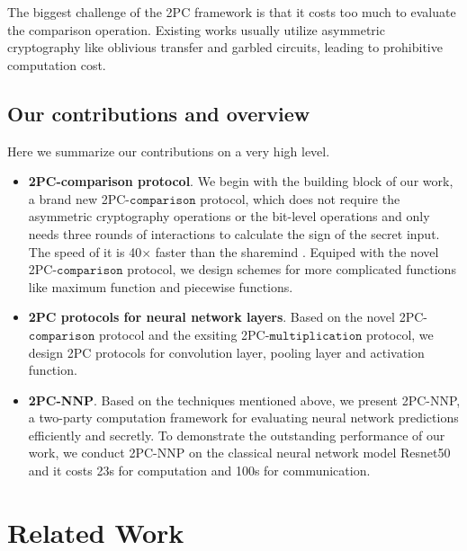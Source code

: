 \documentclass[letterpaper]{article} %
\begin{document}
    The biggest challenge of the 2PC framework is that it costs too much to
    evaluate the comparison operation.
    Existing works usually utilize asymmetric cryptography like oblivious transfer and garbled circuits,
    leading to prohibitive computation cost.


    \subsection{Our contributions and overview}%
    Here we summarize our contributions on a very high level.


    \begin{itemize}
        \item \textbf{2PC-comparison protocol}.
        We begin with the building block of our work, a brand new 2PC-$\mathtt{comparison}$ protocol,
        which does not require the asymmetric cryptography operations or the bit-level operations
        and only needs three rounds of interactions to calculate the sign of the secret input.
        The speed of it is 40$\times$ faster than the sharemind \cite{Sharemind}.
        Equiped with the novel 2PC-$\mathtt{comparison}$ protocol, we design schemes for more complicated functions
        like maximum function and piecewise functions.

        \item \textbf{2PC protocols for neural network layers}.
        Based on the novel 2PC-$\mathtt{comparison}$ protocol and the exsiting 2PC-$\mathtt{multiplication}$ protocol,
        we design 2PC protocols for convolution layer, pooling layer and activation function.

        \item \textbf{2PC-NNP}.
        Based on the techniques mentioned above,
        we present 2PC-NNP, a two-party computation framework
        for evaluating neural network predictions efficiently and secretly.
        To demonstrate the outstanding performance of our work,
        we conduct 2PC-NNP on the classical neural network model Resnet50 and
        it costs 23s for computation and 100s for communication.

    \end{itemize}






\section{Related Work}
\end{document}
